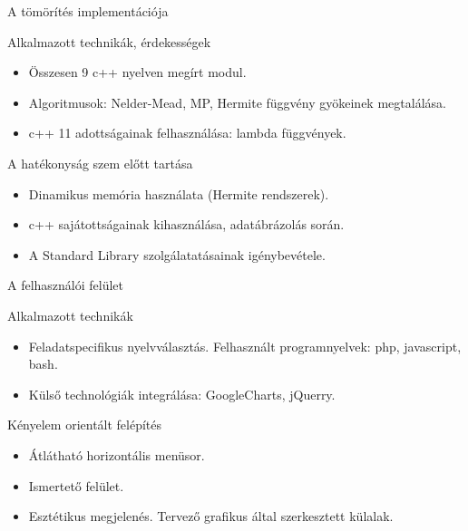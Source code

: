 \documentclass{beamer}
\begin{document}
\begin{frame}{A tömörítés implementációja}
\linespread{0.8}
\small
\vspace{-2mm}
\begin{block}{Alkalmazott technikák, érdekességek}
	\begin{itemize}
		\item Összesen 9 c++ nyelven megírt modul.
		\item Algoritmusok: Nelder-Mead, MP, Hermite függvény gyökeinek megtalálása.
		\item c++ 11 adottságainak felhasználása: lambda függvények. 
	\end{itemize}
	\end{block}		
	
\begin{block}{A hatékonyság szem előtt tartása}
	\begin{itemize}
		\item Dinamikus memória használata (Hermite rendszerek).
		\item c++ sajátottságainak kihasználása, adatábrázolás során.
		\item A Standard Library szolgálatatásainak igénybevétele. 
	\end{itemize}
\end{block}		
\end{frame}

\begin{frame}{A felhasználói felület}
\linespread{0.8}
\small
\vspace{-2mm}
\begin{block}{Alkalmazott technikák}
	\begin{itemize}
		\item Feladatspecifikus nyelvválasztás. Felhasznált programnyelvek: php, javascript, bash.
		\item Külső technológiák integrálása: GoogleCharts, jQuerry.
	\end{itemize}
	\end{block}		
	
\begin{block}{Kényelem orientált felépítés}
	\begin{itemize}
		\item Átlátható horizontális menüsor.
		\item Ismertető felület.
		\item Esztétikus megjelenés. Tervező grafikus által szerkesztett külalak. 
	\end{itemize}
\end{block}		

\end{frame}
\end{document}
